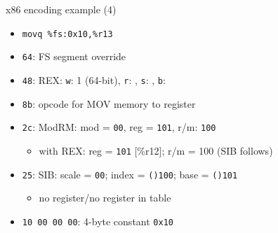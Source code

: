 \begin{frame}[fragile,label=x86ex4]{x86 encoding example (4)}
    \begin{itemize}
    \item \lstinline|movq %fs:0x10,%r13|
    \item {\tt 64}: FS segment override
    \item {\tt 48}: REX: {\tt w}: 1 (64-bit), {\tt r}: \textcolor{violet!80!black}{\tt {}}, {\tt s}: \textcolor{blue!80!black}{\tt \myemph<3>{0}}, {\tt b}: \textcolor{green!80!black}{\tt {}}
    \item {\tt 8b}: opcode for MOV memory to register
    \item {\tt 2c}: ModRM: mod = {\tt 00}, reg = {\tt 101}, r/m: {\tt 100}
        \begin{itemize}
        \item with REX: reg = {\tt \textbf{\textcolor{violet!80!black}{}}101} [\%r12]; r/m = {100} (SIB follows)
        \end{itemize}
    \item {\tt 25}: SIB: scale = {\tt 00}; index = {\tt (\textcolor{blue!80!black}{\myemph<3>{0}})100}; base = {\tt (\textcolor{green!80!black}{})101}
        \begin{itemize}
        \item no register/no register in table
        \end{itemize}
    \item {\tt 10 00 00 00}: 4-byte constant {\tt 0x10}
    \end{itemize}
\end{frame}


